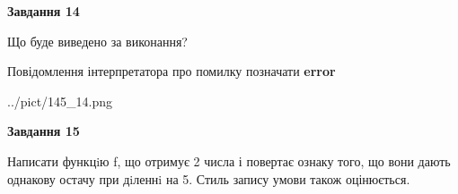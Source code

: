 \documentclass[11pt, ukrainian]{article}
\begin{document}
{\begin {large}
{\begin {center}\textbf{Завдання 14}\end {center}}\par
Що буде виведено за виконання? \par
Повідомлення інтерпретатора про помилку позначати \textbf{error}

\begin{center}
	{../pict/145_14.png}
\end{center}
\newpage

{\begin {center}\textbf{Завдання 15}\end {center}}\par

Написати функцiю f, що отримує 2 числа і повертає ознаку того, що вони дають однакову остачу при дiленнi на 5. Стиль запису умови також оцінюється.\par
\newpage

\end {large}}
\end{document}
